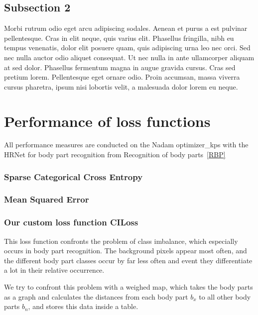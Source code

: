 \subsection{Subsection 2}
Morbi rutrum odio eget arcu adipiscing sodales. Aenean et purus a est pulvinar pellentesque. Cras in elit neque, quis
varius elit. Phasellus fringilla, nibh eu tempus venenatis, dolor elit posuere quam, quis adipiscing urna leo nec
orci. Sed nec nulla auctor odio aliquet consequat. Ut nec nulla in ante ullamcorper aliquam at sed dolor. Phasellus
fermentum magna in augue gravida cursus. Cras sed pretium lorem. Pellentesque eget ornare odio. Proin accumsan, massa
viverra cursus pharetra, ipsum nisi lobortis velit, a malesuada dolor lorem eu neque.



\section{Performance of loss functions}
All performance measures are conducted on the Nadam optimizer_kps with the HRNet for body part recognition from
Recognition of body parts~\ref{RBP}

\subsubsection{Sparse Categorical Cross Entropy}

\subsubsection{Mean Squared Error}

\subsubsection{Our custom loss function CILoss}
This loss function confronts the problem of class imbalance, which especially occurs in body part recognition.
The background pixels appear most often, and the different body part classes occur by far less often and event they
differentiate a lot in their relative occurrence.

We try to confront this problem with a weighed map, which takes the body parts as a graph and calculates
the distances from each body part $b_x$ to all other body parts $b_n$, and stores this data inside a table.

